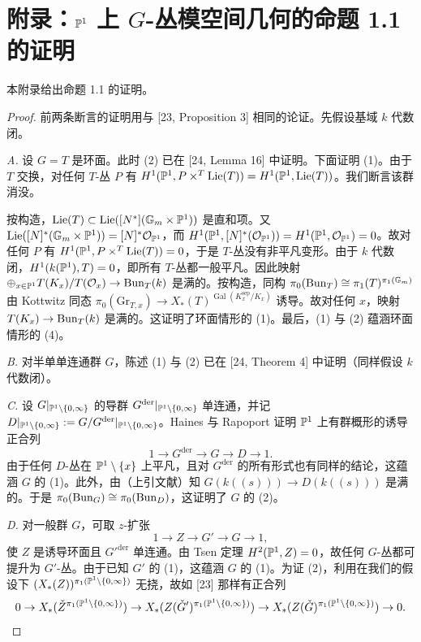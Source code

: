 
\section{附录：$\mathbb{P}^1$ 上 $G$-丛模空间几何的命题 1.1 的证明}

本附录给出命题 1.1 的证明。

\begin{proof}
前两条断言的证明用与 [23, Proposition 3] 相同的论证。先假设基域 $k$ 代数闭。

\emph{A.} 设 $G=T$ 是环面。此时 (2) 已在 [24, Lemma 16] 中证明。下面证明 (1)。由于 $T$ 交换，对任何 $T$-丛 $P$ 有 $H^1(\mathbb{P}^1,P\times^T\mathrm{Lie}(T))=H^1(\mathbb{P}^1,\mathrm{Lie}(T))$。我们断言该群消没。

按构造，$\mathrm{Lie}(T)\subset\mathrm{Lie}([N^*](\mathbb{G}_m\times\mathbb{P}^1))$ 是直和项。又 $\mathrm{Lie}([N]^*(\mathbb{G}_m\times\mathbb{P}^1))=[N]^*\mathcal O_{\mathbb{P}^1}$，而 $H^1(\mathbb{P}^1,[N]^*(\mathcal O_{\mathbb{P}^1}))=H^1(\mathbb{P}^1,\mathcal O_{\mathbb{P}^1})=0$。故对任何 $P$ 有 $H^1(\mathbb{P}^1,P\times^T\mathrm{Lie}(T))=0$，于是 $T$-丛没有非平凡变形。由于 $k$ 代数闭，$H^1(k(\mathbb{P}^1),T)=0$，即所有 $T$-丛都一般平凡。因此映射 $\oplus_{x\in\mathbb{P}^1}T(K_x)/T(\mathcal O_x)\to\mathrm{Bun}_T(k)$ 是满的。按构造，同构 $\pi_0(\mathrm{Bun}_T)\cong\pi_1(T)^{\pi_1(\mathbb{G}_m)}$ 由 Kottwitz 同态 $\pi_0(\mathrm{Gr}_{T,x})\to X_*(T)^{\operatorname{Gal}(K^{\mathrm{sep}}_x/K_x)}$ 诱导。故对任何 $x$，映射 $T(K_x)\to\mathrm{Bun}_T(k)$ 是满的。这证明了环面情形的 (1)。最后，(1) 与 (2) 蕴涵环面情形的 (4)。

\emph{B.} 对半单单连通群 $G$，陈述 (1) 与 (2) 已在 [24, Theorem 4] 中证明（同样假设 $k$ 代数闭）。

\emph{C.} 设 $G|_{\mathbb{P}^1\setminus\{0,\infty\}}$ 的导群 $G^{\mathrm{der}}|_{\mathbb{P}^1\setminus\{0,\infty\}}$ 单连通，并记 $D|_{\mathbb{P}^1\setminus\{0,\infty\}}:=G/G^{\mathrm{der}}|_{\mathbb{P}^1\setminus\{0,\infty\}}$。Haines 与 Rapoport 证明 $\mathbb{P}^1$ 上有群概形的诱导正合列
\[
1\to G^{\mathrm{der}}\to G\to D\to 1.
\]
由于任何 $D$-丛在 $\mathbb{P}^1\setminus\{x\}$ 上平凡，且对 $G^{\mathrm{der}}$ 的所有形式也有同样的结论，这蕴涵 $G$ 的 (1)。此外，由（上引文献）知 $G(k((s)))\to D(k((s)))$ 是满的。于是 $\pi_0(\mathrm{Bun}_G)\cong\pi_0(\mathrm{Bun}_D)$，这证明了 $G$ 的 (2)。

\emph{D.} 对一般群 $G$，可取 $z$-扩张
\[
1\to Z\to G'\to G\to 1,
\]
使 $Z$ 是诱导环面且 $G'^{\mathrm{der}}$ 单连通。由 Tsen 定理 $H^2(\mathbb{P}^1,Z)=0$，故任何 $G$-丛都可提升为 $G'$-丛。由于已知 $G'$ 的 (1)，这蕴涵 $G$ 的 (1)。为证 (2)，利用在我们的假设下 $(X_*(Z))^{\pi_1(\mathbb{P}^1\setminus\{0,\infty\})}$ 无挠，故如 [23] 那样有正合列
\[
0\to X_*(\check Z^{\pi_1(\mathbb{P}^1\setminus\{0,\infty\})})\to X_*(Z(\check G')^{\pi_1(\mathbb{P}^1\setminus\{0,\infty\})})\to X_*(Z(\check G)^{\pi_1(\mathbb{P}^1\setminus\{0,\infty\})})\to 0.
\]


\end{proof}
